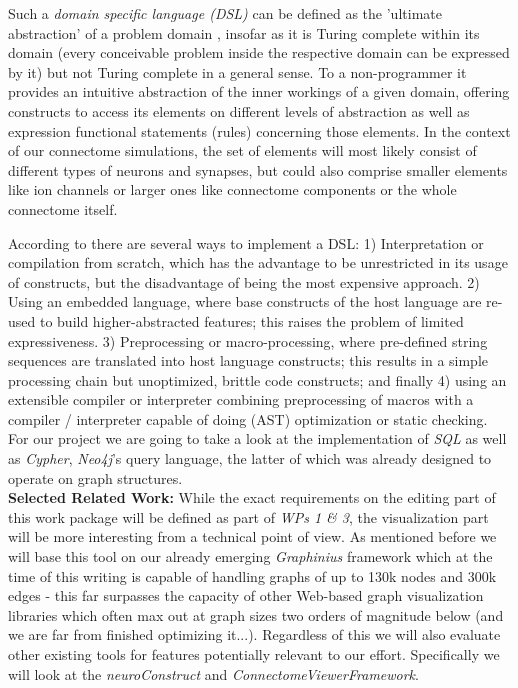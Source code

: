 \documentclass[a4paper,11pt]{article}
\begin{document}
Such a \textit{domain specific language (DSL)} can be defined as the 'ultimate abstraction' of a problem domain \citep{Hudak1998DSL}, insofar as it is Turing complete within its domain (every conceivable problem inside the respective domain can be expressed by it) but not Turing complete in a general sense. To a non-programmer it provides an intuitive abstraction of the inner workings of a given domain, offering constructs to access its elements on different levels of abstraction as well as expression functional statements (rules) concerning those elements. In the context of our connectome simulations, the set of elements will most likely consist of different types of neurons and synapses, but could also comprise smaller elements like ion channels or larger ones like connectome components or the whole connectome itself.

According to \citep{Deursen2000DSLImplementation} there are several ways to implement a DSL: 1) Interpretation or compilation from scratch, which has the advantage to be unrestricted in its usage of constructs, but the disadvantage of being the most expensive approach. 2) Using an embedded language, where base constructs of the host language are re-used to build higher-abstracted features; this raises the problem of limited expressiveness. 3) Preprocessing or macro-processing, where pre-defined string sequences are translated into host language constructs; this results in a simple processing chain but unoptimized, brittle code constructs; and finally 4) using an extensible compiler or interpreter combining preprocessing of macros with a compiler / interpreter capable of doing (AST) optimization or static checking. For our project we are going to take a look at the implementation of \emph{SQL} as well as \emph{Cypher}, \emph{Neo4j}’s query language, the latter of which was already designed to operate on graph structures.
\\[0,2cm]


\textbf{Selected Related Work:}
While the exact requirements on the editing part of this work package will be defined as part of \emph{WPs 1 \& 3}, the visualization part will be more interesting from a technical point of view. As mentioned before we will base this tool on our already emerging \emph{Graphinius} framework which at the time of this writing is capable of handling graphs of up to 130k nodes and 300k edges - this far surpasses the capacity of other Web-based graph visualization libraries which often max out at graph sizes two orders of magnitude below (and we are far from finished optimizing it...). Regardless of this we will also evaluate other existing tools for features potentially relevant to our effort. Specifically we will look at the \emph{neuroConstruct} and \emph{ConnectomeViewerFramework}.
\end{document}
